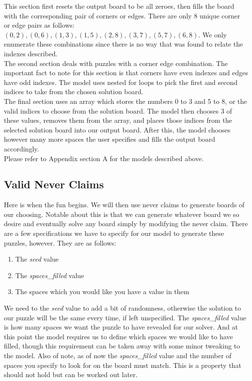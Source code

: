 \documentclass[a4paper]{article}
\begin{document}
This section first resets the output board to be all zeroes, then fills the board with the corresponding pair of corners or edges. There are only 8 unique corner or edge pairs as follows: $(0,2), (0,6), (1,3), (1,5), (2,8), (3,7), (5,7), (6,8)$. We only enumerate these combinations since there is no way that was found to relate the indexes described. \\

The second section deals with puzzles with a corner edge combination. The important fact to note for this section is that corners have even indexes and edges have odd indexes. The model uses nested for loops to pick the first and second indices to take from the chosen solution board. \\

The final section uses an array which stores the numbers 0 to 3 and 5 to 8, or the valid indices to choose from the solution board. The model then chooses 3 of these values, removes them from the array, and places those indices from the selected solution board into our output board. After this, the model chooses however many more spaces the user specifies and fills the output board accordingly. \\

Please refer to Appendix section A for the models described above.

\subsection{Valid Never Claims}
Here is when the fun begins. We will then use never claims to generate boards of our choosing. Notable about this is that we can generate whatever board we so desire and eventually solve any board simply by modifying the never claim. There are a few specifications we have to specify for our model to generate these puzzles, however. They are as follows: 

\begin{enumerate}
\item The {\it seed} value
\item The {\it spaces\_filled} value
\item The spaces which you would like you have a value in them
\end{enumerate}

We need to the {\it seed} value to add a bit of randomness, otherwise the solution to our puzzle will be the same every time, if left unspecified. The {\it spaces\_filled} value is how many spaces we want the puzzle to have revealed for our solver. And at this point the model requires us to define which spaces we would like to have filled, though this requirement can be taken away with some minor tweaking to the model. Also of note, as of now the {\it spaces\_filled} value and the number of spaces you specify to look for on the board must match. This is a property that should not hold but can be worked out later. \\
\end{document}
